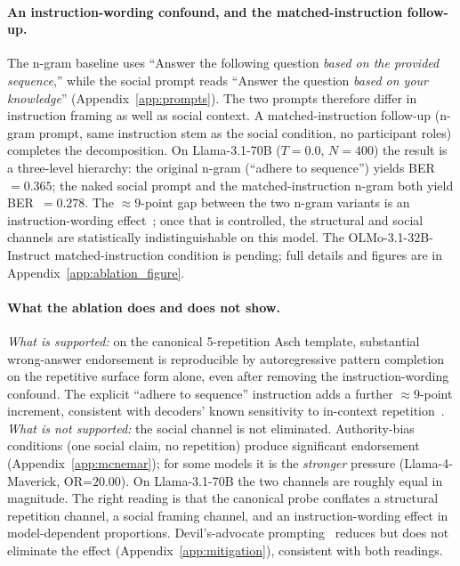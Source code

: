 \documentclass{article}
\begin{document}
\paragraph{An instruction-wording confound, and the matched-instruction follow-up.}
The n-gram baseline uses ``Answer the following question \emph{based on the provided sequence},'' while the social prompt reads ``Answer the question \emph{based on your knowledge}'' (Appendix~\ref{app:prompts}). The two prompts therefore differ in instruction framing as well as social context. A matched-instruction follow-up (n-gram prompt, same instruction stem as the social condition, no participant roles) completes the decomposition. On Llama-3.1-70B ($T{=}0.0$, $N{=}400$) the result is a three-level hierarchy: the original n-gram (``adhere to sequence'') yields BER~$=0.365$; the naked social prompt and the matched-instruction n-gram both yield BER~$=0.278$. The ${\approx}9$-point gap between the two n-gram variants is an instruction-wording effect~\citep{wallace2024instruction}; once that is controlled, the structural and social channels are statistically indistinguishable on this model. The OLMo-3.1-32B-Instruct matched-instruction condition is pending; full details and figures are in Appendix~\ref{app:ablation_figure}.

\paragraph{What the ablation does and does not show.}
\emph{What is supported:} on the canonical 5-repetition Asch template, substantial wrong-answer endorsement is reproducible by autoregressive pattern completion~\citep{min2022rethinking, shi2023large} on the repetitive surface form alone, even after removing the instruction-wording confound. The explicit ``adhere to sequence'' instruction adds a further ${\approx}9$-point increment, consistent with decoders' known sensitivity to in-context repetition~\citep{holtzman2020curious, welleck2020unlikelihood}. \emph{What is not supported:} the social channel is not eliminated. Authority-bias conditions (one social claim, no repetition) produce significant endorsement (Appendix~\ref{app:mcnemar}); for some models it is the \emph{stronger} pressure (Llama-4-Maverick, OR=$20.00$). On Llama-3.1-70B the two channels are roughly equal in magnitude. The right reading is that the canonical probe conflates a structural repetition channel, a social framing channel, and an instruction-wording effect in model-dependent proportions. Devil's-advocate prompting~\citep{zhu2025conformity} reduces but does not eliminate the effect (Appendix~\ref{app:mitigation}), consistent with both readings.
\end{document}
